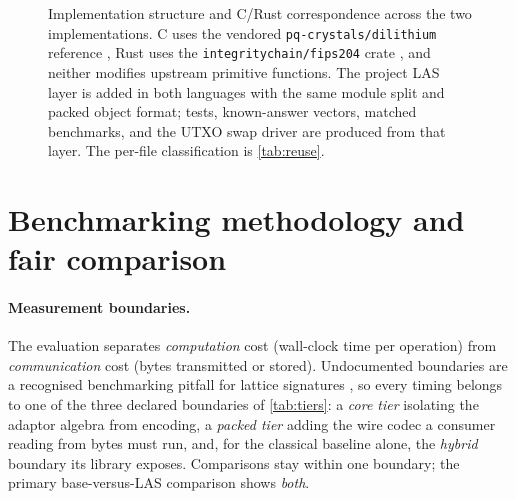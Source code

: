 \begin{figure}[htbp]
  \caption[Implementation structure and C/Rust correspondence]{Implementation structure and
  C/Rust correspondence across the two implementations. C uses the vendored
  \texttt{pq-crystals/dilithium} reference \cite{pqcrystalsdilithium}, Rust uses the
  \texttt{integritychain/fips204} crate \cite{fips204crate}, and neither modifies
  upstream primitive functions. The project LAS layer is added in both languages with
  the same module split and packed object format; tests, known-answer vectors, matched
  benchmarks, and the UTXO swap driver are produced from that layer. The per-file
  classification is \cref{tab:reuse}.}
  \label{fig:repostructure}
\end{figure}

\section{Benchmarking methodology and fair comparison}
\label{sec:benchmethod}

\paragraph{Measurement boundaries.}
The evaluation separates \emph{computation} cost (wall-clock time per operation) from
\emph{communication} cost (bytes transmitted or stored).
Undocumented boundaries are a recognised benchmarking pitfall for lattice signatures
\cite{riou2026apples}, so every timing belongs to one of the three declared boundaries of
\cref{tab:tiers}: a \emph{core tier} isolating the adaptor algebra from encoding, a
\emph{packed tier} adding the wire codec a consumer reading from bytes must run, and,
for the classical baseline alone, the \emph{hybrid} boundary its library exposes.
Comparisons stay within one
boundary; the primary base-versus-LAS comparison shows \emph{both}.


